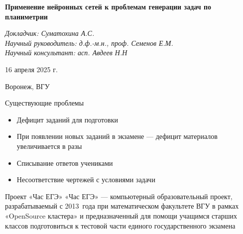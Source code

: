 \documentclass[aspectratio=169,12pt]{beamer}
\begin{document}
\begin{frame}
	\begin{center}
		\vspace{1cm}
		\Large\textcolor{NordBrightBlue}{\textbf{Применение нейронных сетей к проблемам генерации
				задач по планиметрии}}\\
	\end{center}
	\vspace{0.5cm}
	\large\textcolor{NordBlue}{\textit{Докладчик: Суматохина А.С.}}\\
	\large\textcolor{NordBlue}{\textit{Научный руководитель: д.ф.-м.н., проф. Семенов Е.М.}}\\
	\large\textcolor{NordBlue}{\textit{Научный консультант: асп. Авдеев Н.Н}}\\
	\vspace{0.5cm}
	\begin{center}
		16 апреля 2025 г.
	\end{center}
	\begin{center}
		Воронеж, ВГУ
	\end{center}

\end{frame}

\begin{frame}{Существующие проблемы}
	\begin{itemize}
		\item Дефицит заданий для подготовки
		\item При появлении новых заданий в экзамене — дефицит материалов увеличивается в разы
		\item Списывание ответов учениками
		\item Несоответствие чертежей с условиями задачи
	\end{itemize}
\end{frame}

\begin{frame}{Проект «Час ЕГЭ»}
	\large
	«Час ЕГЭ» — компьютерный образовательный проект, разрабатываемый с 2013~года при математическом факультете ВГУ в рамках «OpenSource кластера» и предназначенный для помощи учащимся старших классов подготовиться к тестовой части единого государственного экзамена
\end{frame}
\end{document}
